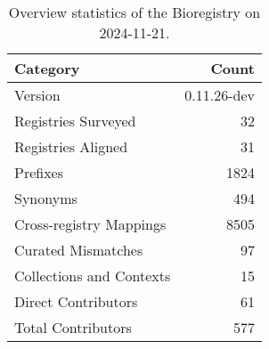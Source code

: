\begin{table}
\caption{Overview statistics of the Bioregistry on 2024-11-21.}
\label{tab:bioregistry-summary}
\begin{tabular}{lr}
\toprule
Category & Count \\
\midrule
Version & 0.11.26-dev \\
Registries Surveyed & 32 \\
Registries Aligned & 31 \\
Prefixes & 1824 \\
Synonyms & 494 \\
Cross-registry Mappings & 8505 \\
Curated Mismatches & 97 \\
Collections and Contexts & 15 \\
Direct Contributors & 61 \\
Total Contributors & 577 \\
\bottomrule
\end{tabular}
\end{table}
